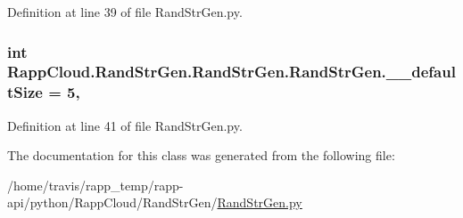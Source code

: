 Definition at line 39 of file Rand\-Str\-Gen.\-py.

\hypertarget{classRappCloud_1_1RandStrGen_1_1RandStrGen_1_1RandStrGen_a7925ff32ee60a9ba23e585c4a96f050c}{
\subsubsection[{\-\_\-\-\_\-default\-Size}]{\setlength{\rightskip}{0pt plus 5cm}int Rapp\-Cloud.\-Rand\-Str\-Gen.\-Rand\-Str\-Gen.\-Rand\-Str\-Gen.\-\_\-\-\_\-default\-Size = 5\hspace{0.3cm}{\ttfamily [static]}, {\ttfamily [private]}}}\label{classRappCloud_1_1RandStrGen_1_1RandStrGen_1_1RandStrGen_a7925ff32ee60a9ba23e585c4a96f050c}


Definition at line 41 of file Rand\-Str\-Gen.\-py.



The documentation for this class was generated from the following file\-:\begin{DoxyCompactItemize}
\item 
/home/travis/rapp\-\_\-temp/rapp-\/api/python/\-Rapp\-Cloud/\-Rand\-Str\-Gen/\hyperlink{RandStrGen_8py}{Rand\-Str\-Gen.\-py}\end{DoxyCompactItemize}
